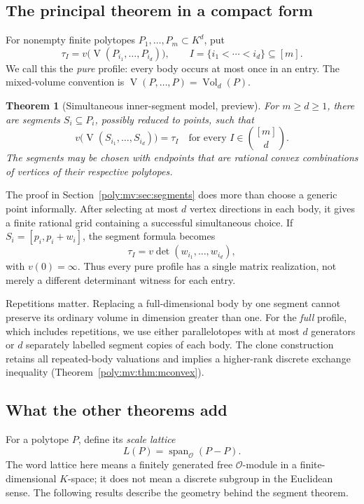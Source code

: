 \documentclass[11pt,a4paper]{article}
\numberwithin{equation}{section}
\newtheorem{theorem}{Theorem}[section]
\theoremstyle{plain}
\newcommand{\R}{\mathbb R}
\newcommand{\Span}{\operatorname{span}_{\R}}%
\newcommand{\OO}{\mathcal O}
\newcommand{\Vol}{\operatorname{Vol}}
\newcommand{\MV}{\operatorname{V}}
\newcommand{\spanplain}{\operatorname{span}}%
\begin{document}
\subsection{The principal theorem in a compact form}
For nonempty finite polytopes $P_1,\ldots,P_m\subset K^d$, put
\[
 \tau_I=v\bigl(\MV(P_{i_1},\ldots,P_{i_d})\bigr),
 \qquad I=\{i_1<\cdots<i_d\}\subseteq[m].
\]
We call this the \emph{pure} profile: every body occurs at most once in an
entry. The mixed-volume convention is $\MV(P,\ldots,P)=\Vol_d(P)$.

\begin{theorem}[Simultaneous inner-segment model, preview]
\label{poly:mv:thm:preview}
For $m\ge d\ge1$, there are segments $S_i\subseteq P_i$, possibly reduced
to points, such that
\[
 v\bigl(\MV(S_{i_1},\ldots,S_{i_d})\bigr)=\tau_I
 \quad\text{for every }I\in\binom{[m]}d.
\]
The segments may be chosen with endpoints that are rational convex
combinations of vertices of their respective polytopes.
\end{theorem}

The proof in Section~\ref{poly:mv:sec:segments} does more than choose a generic
point informally. After selecting at most $d$ vertex directions in each
body, it gives a finite rational grid containing a successful simultaneous
choice. If $S_i=[p_i,p_i+w_i]$, the segment formula becomes
\[
 \tau_I=v\det(w_{i_1},\ldots,w_{i_d}),
\]
with $v(0)=\infty$. Thus every pure profile has a single matrix realization,
not merely a different determinant witness for each entry.

Repetitions matter. Replacing a full-dimensional body by one segment cannot
preserve its ordinary volume in dimension greater than one. For the
\emph{full} profile, which includes repetitions, we use either parallelotopes
with at most $d$ generators or $d$ separately labelled segment copies of
each body. The clone construction retains all repeated-body valuations and
implies a higher-rank discrete exchange inequality
(Theorem~\ref{poly:mv:thm:mconvex}).

\subsection{What the other theorems add}
For a polytope $P$, define its \emph{scale lattice}
\[
 L(P)=\spanplain_{\OO}(P-P).
\]
The word lattice here means a finitely generated free $\OO$-module in a
finite-dimensional $K$-space; it does not mean a discrete subgroup in the
Euclidean sense. The following results describe the geometry behind the
segment theorem.
\end{document}
